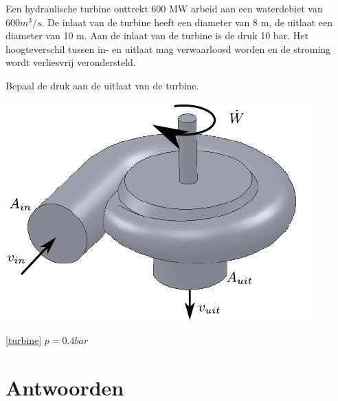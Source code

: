 \begin{toepassing}[*]
	\label{turbine}
Een hydraulische turbine onttrekt 600 MW arbeid aan een waterdebiet van $600 \unit{m^3/s}$. De inlaat van de turbine heeft een diameter van 8 m, de uitlaat een diameter van 10 m. Aan de inlaat van de turbine is de druk 10 bar. Het hoogteverschil tussen in- en uitlaat mag verwaarloosd worden en de stroming wordt verliesvrij verondersteld.

Bepaal de druk aan de uitlaat van de turbine.

	\centering
	\includegraphics{fig/behoudsvergelijkingen/turbine}
\end{toepassing}
\begin{antwoord}{\ref{turbine}}
	$p = 0.4 \unit{bar}$
\end{antwoord}

\section*{Antwoorden}
	\begin{multicols}{2}
	\end{multicols}